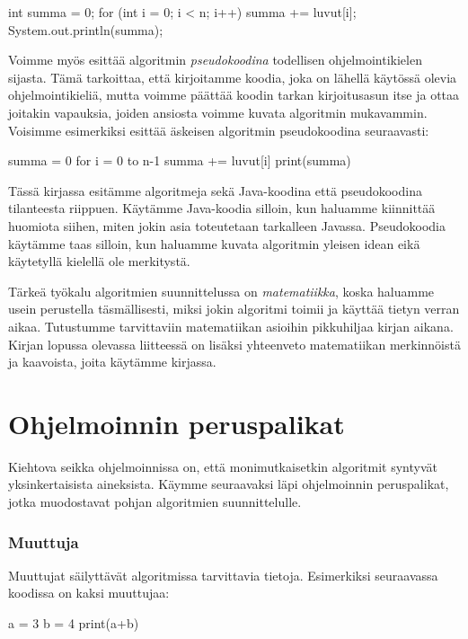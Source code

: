 \begin{code}
int summa = 0;
for (int i = 0; i < n; i++) {
    summa += luvut[i];
}
System.out.println(summa);
\end{code}


Voimme myös esittää algoritmin \emph{pseudokoodina}
todellisen ohjelmointikielen sijasta.
Tämä tarkoittaa, että kirjoitamme koodia,
joka on lähellä käytössä olevia ohjelmointikieliä, mutta voimme
päättää koodin tarkan kirjoitusasun itse ja ottaa joitakin vapauksia,
joiden ansiosta voimme kuvata algoritmin mukavammin.
Voisimme esimerkiksi esittää äskeisen algoritmin pseudokoodina seuraavasti:

\begin{code}
summa = 0
for i = 0 to n-1
    summa += luvut[i]
print(summa)
\end{code}

Tässä kirjassa esitämme algoritmeja sekä Java-koodina että pseudokoodina
tilanteesta riippuen.
Käytämme Java-koodia silloin, kun haluamme kiinnittää huomiota siihen,
miten jokin asia toteutetaan tarkalleen Javassa.
Pseudokoodia käytämme taas silloin, kun haluamme kuvata algoritmin yleisen
idean eikä käytetyllä kielellä ole merkitystä.

Tärkeä työkalu algoritmien suunnittelussa on \emph{matematiikka},
koska haluamme usein perustella täsmällisesti,
miksi jokin algoritmi toimii ja käyttää tietyn verran aikaa.
Tutustumme tarvittaviin matematiikan asioihin pikkuhiljaa kirjan aikana.
Kirjan lopussa olevassa liitteessä on lisäksi yhteenveto matematiikan
merkinnöistä ja kaavoista, joita käytämme kirjassa.

\section{Ohjelmoinnin peruspalikat}

Kiehtova seikka ohjelmoinnissa on, että monimutkaisetkin algoritmit
syntyvät yksinkertaisista aineksista.
Käymme seuraavaksi läpi ohjelmoinnin peruspalikat,
jotka muodostavat pohjan algoritmien suunnittelulle.

\subsubsection{Muuttuja}

Muuttujat säilyttävät algoritmissa tarvittavia tietoja.
Esimerkiksi seuraavassa koodissa on kaksi muuttujaa:

\begin{code}
a = 3
b = 4
print(a+b)
\end{code}

